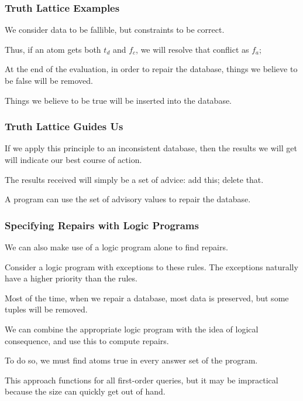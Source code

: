 \begin{frame}
\frametitle{Truth Lattice Examples}

We consider data to be fallible, but constraints to be correct.

Thus, if an atom gets both $t_d$ and $f_c$, we will resolve that conflict as $f_a$; 
 
 At the end of the evaluation, in order to repair the database, things we believe to 
be false will be removed.

Things we believe to be true will be inserted into the database.

\end{frame}

\begin{frame}
\frametitle{Truth Lattice Guides Us}

If we apply this principle to an inconsistent database, then the results we will get will indicate our best course of action. 

The results received will simply be a set of advice: add this; delete that.

A program can use the set of advisory values to repair the database.


\end{frame}


\begin{frame}
\frametitle{Specifying Repairs with Logic Programs}

We can also make use of a logic program alone to find repairs.

Consider a logic program with exceptions to these rules. The exceptions naturally have a higher priority than the rules.

Most of the time, when we repair a database, most data is preserved, but some tuples will be removed. 

We can combine the appropriate logic program with the idea of logical consequence, and use this to compute repairs.

To do so, we must find atoms true in every answer set of the program. 

This approach functions for all first-order queries, but it may be impractical because the size can quickly get out of hand.

\end{frame}

